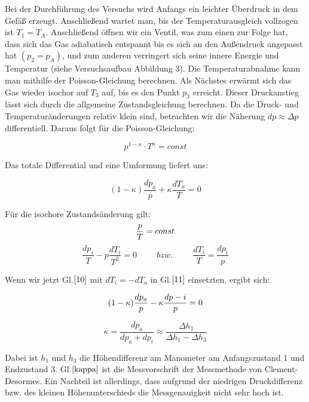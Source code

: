 \documentclass{article}
\begin{document}
{Bei der Durchführung des Versuchs wird Anfangs ein leichter Überdruck in dem Gefäß erzeugt. Anschließend wartet man, bis der Temperaturausgleich vollzogen ist \(T_{1}=T_{A}\). Anschließend öffnen wir ein Ventil, was zum einen zur Folge hat, dass sich das Gas adiabatisch entspannt bis es sich an den Außendruck angepasst hat \((p_{2} = p_{A})\), und zum anderen verringert sich seine innere Energie und Temperatur (siehe Versuchsaufbau Abbildung 3). Die Temperaturabnahme kann man mithilfe der {\sc Poisson-Gleichung} berechnen. Als Nächstes erwärmt sich das Gas wieder isochor auf \(T_{3}\) auf, bis es den Punkt \(p_{3}\) erreicht. Dieser Druckanstieg lässt sich durch die allgemeine Zustandsgleichung berechnen. Da die Druck- und Temperaturänderungen relativ klein sind, betrachten wir die Näherung \(dp\approx \Delta p\) differentiell. Daraus folgt für die {\sc Poisson-Gleichung}:

\begin{equation}
p^{1-\kappa }\cdot T^\kappa =const
\end{equation}

Das totale Differential und eine Umformung liefert uns:

\begin{equation}
\label{10}
(1-\kappa )\frac{dp_{a}}{p}+\kappa \frac{dT_{a}}{T}=0
\end{equation}

Für die isochore Zustandsänderung gilt:
\begin{equation}
\label{11}
\frac{p}{T}=const \notag
\end{equation}
\begin{equation}
\frac{dp_{i}}{T}-p \frac{dT_{i}}{T^2}=0 \hspace{1cm} bzw. \hspace{1cm} \frac{dT_{i}}{T}=\frac{dp_{i}}{p}
\end{equation}

Wenn wir jetzt Gl.\(\eqref{10}\) mit \(dT_{i}=-dT_{a}\) in Gl.\(\eqref{11}\) einsetzten, ergibt sich:

\begin{equation}
(1-\kappa ) \frac{dp_{a}}{p}-\kappa \frac{dp-{i}}{p}=0 \notag
\end{equation}

\begin{equation}
\label{kappa}
\kappa =\frac{dp_{a}}{dp_{a}+dp_{i}}\approx \frac{\Delta h_{1}}{\Delta h_{1}-\Delta h_{3}}
\end{equation}

Dabei ist \(h_{1}\) und \(h_{3}\) die Höhendifferenz am Manometer am Anfangszustand 1 und Endzustand 3. Gl.\(\eqref{kappa}\) ist die Messvorschrift der Messmethode von Clement-Desormes. Ein Nachteil ist allerdings, dass aufgrund der niedrigen Druckdifferenz bzw. des kleinen Höhenunterschieds die Messgenauigkeit nicht sehr hoch ist.

}
\end{document}
